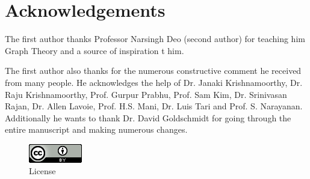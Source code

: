 \chapter{Acknowledgements}
The first author thanks Professor Narsingh Deo (second author) for teaching him Graph Theory and a source of inspiration t him. 

The first author also thanks for the numerous constructive comment he received from many people. He acknowledges the help of Dr. Janaki Krishnamoorthy, Dr. Raju Krishnamoorthy, Prof. Gurpur Prabhu, Prof. Sam Kim, Dr. Srinivasan Rajan, Dr. Allen Lavoie, Prof. H.S. Mani, Dr. Luis Tari and Prof. S. Narayanan. Additionally he wants to thank Dr. David Goldschmidt for going through the entire manuscript and making numerous changes.

\begin{figure}
\begin{center}
\includegraphics{cc-88x31.png}
\caption{License}
\end{center}
\end{figure}